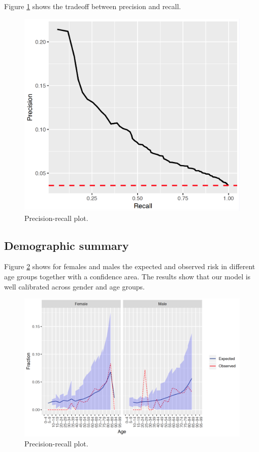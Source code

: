 \documentclass[]{book}
\begin{document}
Figure \ref{fig:plpPrecisionRecall} shows the tradeoff between precision
and recall.

\begin{figure}

{\centering \includegraphics[width=0.8\linewidth]{images/PatientLevelPrediction/precisionRecall} 

}

\caption{Precision-recall plot.}\label{fig:plpPrecisionRecall}
\end{figure}

\subsection{Demographic summary}\label{demographic-summary}

Figure \ref{fig:plpDemoSummary} shows for females and males the expected
and observed risk in different age groups together with a confidence
area. The results show that our model is well calibrated across gender
and age groups.

\begin{figure}

{\centering \includegraphics[width=1\linewidth]{images/PatientLevelPrediction/demographicSummary} 

}

\caption{Precision-recall plot.}\label{fig:plpDemoSummary}
\end{figure}
\end{document}
